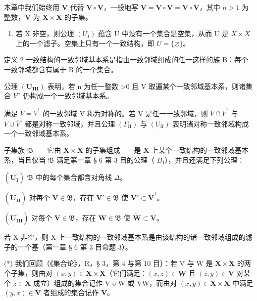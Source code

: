 本章中我们始终用 \(\mathbf{V}\) 代替 \(\mathbf{V} \circ \mathbf{V}\)，一般地写 \(\mathbf{V} = \mathbf{V} \circ \mathbf{V} = \mathbf{V} \circ \mathbf{V}\)，其中 \(n > 1\) 为整数，\(\mathbf{V}\) 为 \(\mathbf{X} \times \mathbf{X}\) 的子集。

\begin{enumerate}
\def\labelenumi{\arabic{enumi})}
\setcounter{enumi}{2}
\tightlist
\item
  若 X 非空，则公理 \((U_{I})\) 蕴含 U 中没有一个集合是空集，从而 U 是 \(X \times X\) 上的一个滤子。空集上只有一个一致结构，即 \(U = \{\varnothing\}\)。
\end{enumerate}

定义 2 一致结构的一致邻域基本系是指由一致邻域组成的任一这样的族 B：每个一致邻域都含有属于 B 的一个集合。

公理 \((\mathbf{U}_{\mathbf{III}})\) 表明，若 n 为任一整数 \textgreater0 且 V 取遍某个一致邻域基本系，则诸集合 \(V^{n}\) 仍构成一个一致邻域基本系。

满足 \(V = \overline{V}^{1}\) 的一致邻域 V 称为对称的。若 V 是任一一致邻域，则 \(V \cap \overline{V}^{1}\) 与 \(V \cup \overline{V}^{1}\) 都是对称一致邻域，并且公理 \((F_{\mathrm{II}})\) 与 \((U_{\mathrm{II}})\) 表明诸对称一致邻域构成一个一致邻域基本系。

子集族 \(\mathfrak{B}\)——它由 \(\mathbf{X} \times \mathbf{X}\) 的子集组成——是 \(\mathbf{X}\) 上某个一致结构的一致邻域基本系，当且仅当 \(\mathfrak{B}\) 满足第一章 § 6 第 3 目的公理（ \(B_{\mathbf{I}}\)），并且还满足下列公理：

\((\mathbf{U}_{\mathbf{I}}^{\prime})\) \(\mathfrak{B}\) 中的每个集合都含对角线 \(\Delta\)。

\((\mathbf{U}_{\mathbf{II}}^{\prime})\) 对每个 \(\mathbf{V} \in \mathfrak{B}\)，存在 \(\mathbf{V}' \in \mathfrak{B}\) 使 \(\mathbf{V}' \subset \overline{\mathbf{V}}^1\)。

\((\mathbf{U}_{\mathbf{III}}^{\prime})\) 对每个 \(\mathbf{V} \in \mathfrak{B}\)，存在 \(\mathbf{W} \in \mathfrak{B}\) 使 \(\tilde{\mathbf{W}} \subset \mathbf{V}\)。

若 X 非空，则 X 上一致结构的一致邻域基本系是由该结构的诸一致邻域组成的滤子的一个基（第一章 § 6 第 3 目命题 3）。

(*) 我们回顾（《集合论》，R，§ 3，第 4 与第 10 目）：若 V 与 W 是 \(\mathbf{X} \times \mathbf{X}\) 的两个子集，则由对 \((x, y) \in \mathbf{X} \times \mathbf{X}\)（它们满足：\((x, z) \in \mathbf{W}\) 且 \((z, y) \in \mathbf{V}\) 对某个 \(z \in \mathbf{X}\) 成立）组成的集合记作 V o W 或 VW，而由对 \((x, y) \in \mathbf{X} \times \mathbf{X}\) 中满足 \((y, x) \in \mathbf{V}\) 者组成的集合记作 \(\overline{\mathbf{V}}\)。

